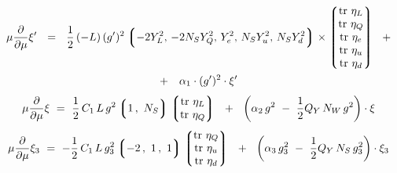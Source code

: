 \documentclass[12pt]{revtex4}
\newcommand{\p}{\partial}
\begin{document}
\begin{align}
\end{align}
%
\begin{multline}
\notag
	\mu \frac{\p}{\p\mu} 
	\xi' ~~=~~
	\frac{1}{2}\, ( - L )\, (g')^2 
	\left\lgroup
		-2 Y_L^2,\, -2 N_S Y_Q^2,\, Y_e^2,\, N_S Y_u^2,\, N_S Y_d^2
	\right\rgroup
	\times
	\left\lgroup
	\begin{matrix}
		{\rm tr~}\eta_L \\
		{\rm tr~}\eta_Q \\
		{\rm tr~}\eta_e \\	
		{\rm tr~}\eta_u \\
		{\rm tr~}\eta_d
	\end{matrix}
	\right\rgroup
	~~+
	\\
\notag
	+~~~
	\alpha_1\cdot (g')^2 \cdot \xi'
\end{multline}
%
\begin{equation}
\notag
	\mu \frac{\p}{\p\mu} 
	\xi 
	~=~
	\frac{1}{2}\, C_1\, L\, g^2 
	\left\lgroup 
	1\,,~ N_S
	\right\rgroup
	\left\lgroup
	\begin{matrix}
		{\rm tr~}\eta_L \\
		{\rm tr~}\eta_Q 
	\end{matrix}
	\right\rgroup
	~~+~~
	\left(
		\alpha_2\, g^2 
		~-~
		\frac{1}{2}
		Q_Y\, N_W\, g^2 
	\right)
	\cdot \xi
\end{equation}
%
\begin{equation}
\notag
	\mu \frac{\p}{\p\mu} 
	\xi_3 
	~=~
	- \frac{1}{2}\, C_1\, L\, g_3^2 
		\left\lgroup
			-2\,,~1\,,~1
		\right\rgroup
	\left\lgroup
	\begin{matrix}
		{\rm tr~}\eta_Q \\
		{\rm tr~}\eta_u \\
		{\rm tr~}\eta_d
	\end{matrix}
	\right\rgroup
	~~+~~
	\left(
		\alpha_3\, g_3^2 
		~-~
		\frac{1}{2}
		Q_Y\, N_S\, g_3^2
	\right)
	\cdot \xi_3
\end{equation}
\end{document}
